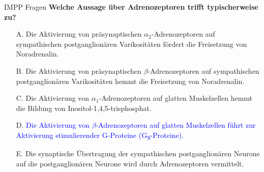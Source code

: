 \documentclass{beamer}
\begin{document}
\begin{frame}{IMPP Fragen}
\textbf{Welche Aussage über Adrenozeptoren trifft typischerweise zu?} \\[0.2 cm]

\begin{itemize}
\item[A.] Die Aktivierung von präsynaptischen \(\alpha_2\)-Adrenozeptoren auf sympathischen postganglionären Varikositäten fördert die Freisetzung von Noradrenalin. 
\item[B.] Die Aktivierung von präsynaptischen \(\beta\)-Adrenozeptoren auf sympathischen  postganglionären Varikositäten hemmt die Freisetzung von Noradrenalin. 
\item[C.] Die Aktivierung von \(\alpha_1\)-Adrenozeptoren auf glatten Muskelzellen hemmt die Bildung von Inositol-1,4,5-trisphosphat.
\item[D.] \textcolor{blue}{Die Aktivierung von \(\beta\)-Adrenozeptoren auf glatten Muskelzellen führt zur Aktivierung stimulierender G-Proteine (G\textsubscript{S}-Proteine).}
\item[E.] Die synaptische Übertragung der sympathischen postganglionären Neurone auf die postganglionären Neurone wird durch Adrenozeptoren vermittelt. 

\end{itemize}
\end{frame}








\end{document}
